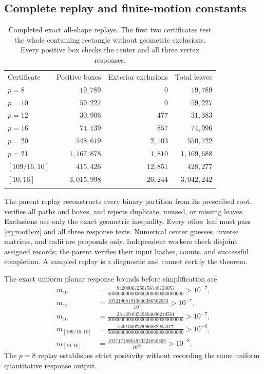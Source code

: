 \documentclass[11pt]{article}
\theoremstyle{definition}
\newcommand{\toprule}{\noalign{\hrule height 0.8pt\vskip4pt}}
\newcommand{\midrule}{\noalign{\vskip3pt\hrule height 0.4pt\vskip3pt}}
\newcommand{\bottomrule}{\noalign{\vskip3pt\hrule height 0.8pt}}
\begin{document}
\subsection{Complete replay and finite-motion constants}
\begin{table}[htbp]
\centering\small
\begin{tabular}{@{}lrrr@{}}
\toprule
Certificate & Positive boxes & Exterior exclusions & Total leaves\\
\midrule
$p=8$ & $19{,}789$ & $0$ & $19{,}789$\\
$p=10$ & $59{,}227$ & $0$ & $59{,}227$\\
$p=12$ & $30{,}906$ & $477$ & $31{,}383$\\
$p=16$ & $74{,}139$ & $857$ & $74{,}996$\\
$p=20$ & $548{,}619$ & $2{,}103$ & $550{,}722$\\
$p=21$ & $1{,}167{,}878$ & $1{,}810$ & $1{,}169{,}688$\\
$[109/16,10]$ & $415{,}426$ & $12{,}851$ & $428{,}277$\\
$[10,16]$ & $3{,}015{,}998$ & $26{,}244$ & $3{,}042{,}242$\\
\bottomrule
\end{tabular}
\caption{Completed exact all-shape replays. The first two certificates
test the whole containing rectangle without geometric exclusions. Every
positive box checks the center and all three vertex responses.}
\label{tab:certificates}
\end{table}
The parent replay reconstructs every binary partition from its prescribed
root, verifies all paths and boxes, and rejects duplicate, unused, or missing
leaves. Exclusions use only the exact geometric inequality. Every other
leaf must pass \eqref{eq:rootbox} and all three response tests. Numerical
center guesses, inverse matrices, and radii are proposals only.
Independent workers check disjoint assigned records; the parent verifies
their input hashes, counts, and successful completion. A sampled replay
is a diagnostic and cannot certify the theorem.

The exact uniform planar response bounds before simplification are
\begin{align*}
 m_{10}&=\frac{84200067250756748723057}{500000000000000000000000000000}
                       >10^{-7},\\
 m_{12}&=\frac{105219681913646386562653}{10^{30}}>10^{-7},\\
 m_{16}&=\frac{28130703549804696210501}{200000000000000000000000000000}
                       >10^{-7},\\
 m_{[109/16,10]}&=\frac{5491360738066882905017}{500000000000000000000000000000}
                       >10^{-8},\\
 m_{[10,16]}&=\frac{10371718864833324830809}{10^{30}}>10^{-8}.
\end{align*}
The $p=8$ replay establishes strict positivity without recording the same
uniform quantitative response output.
\end{document}
